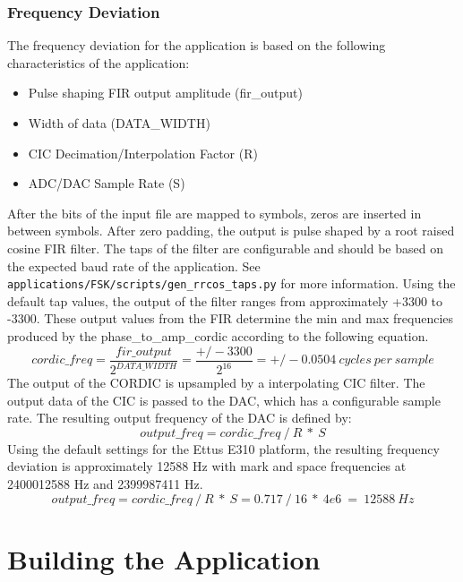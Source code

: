 \subsubsection{Frequency Deviation}
The frequency deviation for the application is based on the following characteristics of the application:
	\begin{itemize}
		\item Pulse shaping FIR output amplitude (fir\_output)
		\item Width of data (DATA\_WIDTH)
		\item CIC Decimation/Interpolation Factor (R)
		\item ADC/DAC Sample Rate (S)
	\end{itemize}
After the bits of the input file are mapped to symbols, zeros are inserted in between symbols. After zero padding, the output is pulse shaped by a root raised cosine FIR filter. The taps of the filter are configurable and should be based on the expected baud rate of the application. See \texttt{applications/FSK/scripts/gen\_rrcos\_taps.py} for more information. Using the default tap values, the output of the filter ranges from approximately +3300 to -3300. These output values from the FIR determine the min and max frequencies produced by the phase\_to\_amp\_cordic according to the following equation.
	\begin{equation} \label{eq:output_freq}
		cordic\_freq = \frac{fir\_output}{2^{DATA\_WIDTH}} = \frac{+/-3300}{2^{16}} = +/- 0.0504\ cycles\ per\ sample
	\end{equation}
The output of the CORDIC is upsampled by a interpolating CIC filter. The output data of the CIC is passed to the DAC, which has a configurable sample rate. The resulting output frequency of the DAC is defined by:
	\begin{equation} \label{eq:output_freq}
		output\_freq = cordic\_freq\ /\ R\ *\ S
	\end{equation}
Using the default settings for the Ettus E310 platform, the resulting frequency deviation is approximately 12588 Hz with mark and space frequencies at 2400012588 Hz and 2399987411 Hz.
	\begin{equation} \label{eq:output_freq}
		output\_freq = cordic\_freq\ /\ R\ *\ S = 0.717\ /\ 16\ *\ 4e6 \ =\ 12588\ Hz
	\end{equation}

\newpage
\section{Building the Application}
